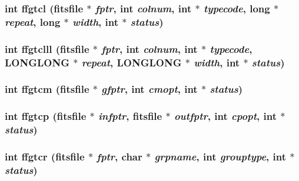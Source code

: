 \subsubsection{\setlength{\rightskip}{0pt plus 5cm}int ffgtcl (\bf{fitsfile} $\ast$ {\em fptr}, int {\em colnum}, int $\ast$ {\em typecode}, long $\ast$ {\em repeat}, long $\ast$ {\em width}, int $\ast$ {\em status})}\label{test_2roimasker_2fitsio_8h_94467c6f6ab0cc865044556b263753a9}


\subsubsection{\setlength{\rightskip}{0pt plus 5cm}int ffgtclll (\bf{fitsfile} $\ast$ {\em fptr}, int {\em colnum}, int $\ast$ {\em typecode}, \bf{LONGLONG} $\ast$ {\em repeat}, \bf{LONGLONG} $\ast$ {\em width}, int $\ast$ {\em status})}\label{test_2roimasker_2fitsio_8h_6c74e11e1c017c8f4734409364b66557}


\subsubsection{\setlength{\rightskip}{0pt plus 5cm}int ffgtcm (\bf{fitsfile} $\ast$ {\em gfptr}, int {\em cmopt}, int $\ast$ {\em status})}\label{test_2roimasker_2fitsio_8h_ba91f4a1df946128be52a14ee69a1fd7}


\subsubsection{\setlength{\rightskip}{0pt plus 5cm}int ffgtcp (\bf{fitsfile} $\ast$ {\em infptr}, \bf{fitsfile} $\ast$ {\em outfptr}, int {\em cpopt}, int $\ast$ {\em status})}\label{test_2roimasker_2fitsio_8h_1803350e3f29d5825dd2cfaee505011c}


\subsubsection{\setlength{\rightskip}{0pt plus 5cm}int ffgtcr (\bf{fitsfile} $\ast$ {\em fptr}, char $\ast$ {\em grpname}, int {\em grouptype}, int $\ast$ {\em status})}\label{test_2roimasker_2fitsio_8h_7329c76bb04c13abb3b2f5bf397eb001}


